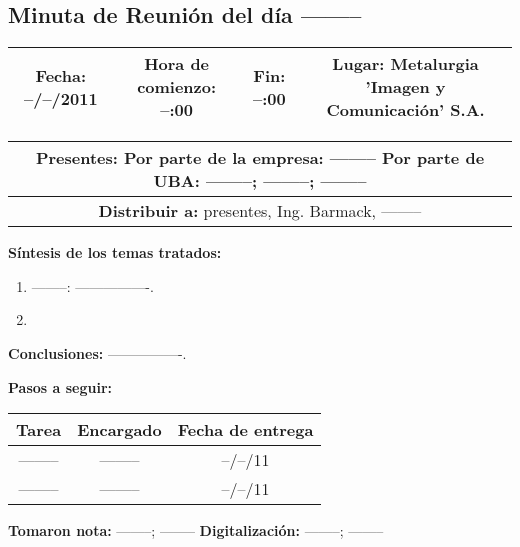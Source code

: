 \newpage


\subsection{Minuta de Reuni\'on del d\'ia --------}


\begin{center}
\begin{tabular}{|c|c|c|c|}
	\hline
	\textbf{Fecha:} --/--/2011 & \textbf{Hora de comienzo:} --:00 & \textbf{Fin:} --:00 & \textbf{Lugar:} Metalurgia 'Imagen y Comunicaci\'on' S.A. \\
	\hline
\end{tabular}
\begin{tabular}{|c|}
	\hline \textbf{Presentes:} Por parte de la empresa: --------
	Por parte de UBA: --------; --------; -------- \\
	\hline \textbf{Distribuir a:} presentes, Ing. Barmack, --------\\
	\hline
\end{tabular} 
\end{center}


\textbf{S\'intesis de los temas tratados:}

\begin{enumerate}
	\item --------: ----------------.

	\item 
\end{enumerate}


\textbf{Conclusiones:} ----------------.


\textbf{Pasos a seguir:}

\begin{tabular}{|c|c|c|}
	\hline \textbf{Tarea} & \textbf{Encargado} & \textbf{Fecha de entrega} \\ 
	\hline -------- & -------- & --/--/11 \\ 
	\hline -------- & -------- & --/--/11 \\ 
	\hline 
\end{tabular} 


\textbf{Tomaron nota:} --------; --------
\textbf{Digitalizaci\'on:} --------; --------
